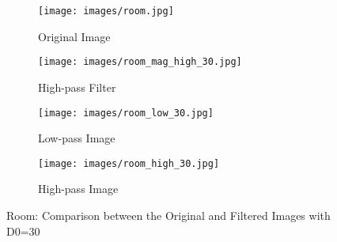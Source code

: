 \begin{figure}[htbp]
    \centering 
    \begin{minipage}{0.8\textwidth} 
        \centering 
        
        \begin{subfigure}[b]{0.45\linewidth} 
            \texttt{[image: images/room.jpg]}
            \caption{Original Image}
        \end{subfigure}
        \hfill
        \begin{subfigure}[b]{0.45\linewidth}
            \texttt{[image: images/room\_mag\_high\_30.jpg]}
            \caption{High-pass Filter}
        \end{subfigure}

        \vspace{0.5cm}
        \begin{subfigure}[b]{0.45\linewidth}
            \texttt{[image: images/room\_low\_30.jpg]}
            \caption{Low-pass Image}
        \end{subfigure}
        \hfill
        \begin{subfigure}[b]{0.45\linewidth}
            \texttt{[image: images/room\_high\_30.jpg]}
            \caption{High-pass Image}
        \end{subfigure}

        \caption{Room: Comparison between the Original and Filtered Images with D0=30}
        \label{fig:room_2}
    \end{minipage}
\end{figure}








% 
% 

